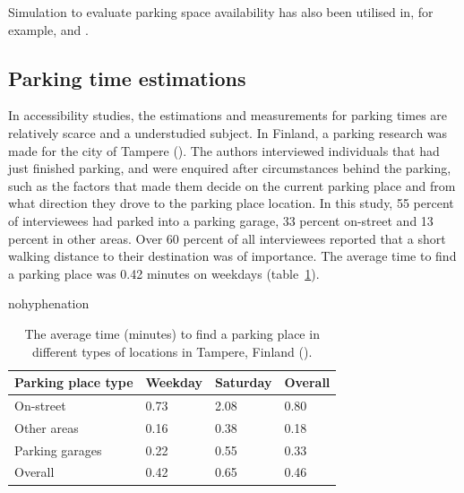Simulation to evaluate parking space availability has also been utilised in, for example,  and .

\newpage
\subsection{Parking time estimations}
\justify

In accessibility studies, the estimations and measurements for parking times are relatively scarce and a understudied subject. In Finland, a parking research was made for the city of Tampere (\cite{Kalenoja2003}). The authors interviewed individuals that had just finished parking, and were enquired after circumstances behind the parking, such as the factors that made them decide on the current parking place and from what direction they drove to the parking place location. In this study, 55 percent of interviewees had parked into a parking garage, 33 percent on-street and 13 percent in other areas. Over 60 percent of all interviewees reported that a short walking distance to their destination was of importance. The average time to find a parking place was 0.42 minutes on weekdays (table~\ref{tab:kalenoja-parktimes}).

\begin{hyphenrules}{nohyphenation}
    \begin{table}[H]
        \centering
        \caption[Parking time results in Kalenoja \& Häyrynen 2003]{The average time (minutes) to find a parking place in different types of locations in Tampere, Finland (\cite{Kalenoja2003}).} 
        \label{tab:kalenoja-parktimes}
        \begin{tabular}{ llll }
            \toprule
            Parking place type  & Weekday   & Saturday  & Overall \\
            \midrule
            On-street           & 0.73      & 2.08      & 0.80 \\
            Other areas         & 0.16      & 0.38      & 0.18 \\
            Parking garages     & 0.22      & 0.55      & 0.33 \\
            Overall             & 0.42      & 0.65      & 0.46 \\
            \bottomrule
        \end{tabular}
    \end{table}
\end{hyphenrules}

